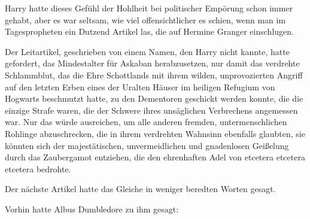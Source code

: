 Harry hatte dieses Gefühl der Hohlheit bei politischer Empörung schon immer gehabt, aber es war seltsam, wie viel offensichtlicher es schien, wenn man im Tagespropheten ein Dutzend Artikel las, die auf Hermine Granger einschlugen.

Der Leitartikel, geschrieben von einem Namen, den Harry nicht kannte, hatte gefordert, das Mindestalter für Askaban herabzusetzen, nur damit das verdrehte Schlammblut, das die Ehre Schottlands mit ihrem wilden, unprovozierten Angriff auf den letzten Erben eines der Uralten Häuser im heiligen Refugium von Hogwarts beschmutzt hatte, zu den Dementoren geschickt werden konnte, die die einzige Strafe waren, die der Schwere ihres unsäglichen Verbrechens angemessen war. Nur das würde ausreichen, um alle anderen fremden, untermenschlichen Rohlinge abzuschrecken, die in ihrem verdrehten Wahnsinn ebenfalls glaubten, sie könnten sich der majestätischen, unvermeidlichen und gnadenlosen Geißelung durch das Zaubergamot entziehen, die den ehrenhaften Adel von etcetera etcetera etcetera bedrohte.

Der nächste Artikel hatte das Gleiche in weniger beredten Worten gesagt.

Vorhin hatte Albus Dumbledore zu ihm gesagt:

